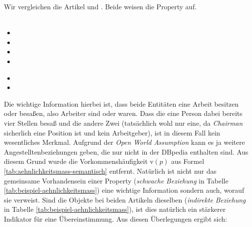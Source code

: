 \begin{bsp}
Wir vergleichen die Artikel  und .
Beide weisen die Property  auf.\\
~\\
 
\begin{itemize}
\item {}
\item {}
\item {}
\item {}
\end{itemize}
 
\begin{itemize}
\item {}
\item {}
\end{itemize}
\end{bsp}

Die wichtige Information hierbei ist, dass beide Entitäten eine Arbeit besitzen oder besaßen, also Arbeiter sind oder waren.
Dass die eine Person dabei bereits vier Stellen besaß und die andere Zwei (tatsächlich wohl nur eine, da \emph{Chairman} sicherlich eine Position ist und kein Arbeitgeber), ist in diesem Fall kein wesentliches Merkmal.
Aufgrund der \emph{Open World Assumption} kann es ja weitere Angestelltenbeziehungen geben, die nur nicht in der DBpedia enthalten sind.
Aus diesem Grund wurde die Vorkommenshäufigkeit v$(p)$ aus Formel \ref{tab:aehnlichkeitsmass-semantisch} entfernt.
Natürlich ist nicht nur das gemeinsame Vorhandensein einer Property (\emph{schwache Beziehung} in Tabelle \ref{tab:beispiel-aehnlichkeitsmass}) eine wichtige Information sondern auch, worauf sie verweist.
Sind die Objekte bei beiden Artikeln dieselben (\emph{indirekte Beziehung} in Tabelle \ref{tab:beispiel-aehnlichkeitsmass}), ist dies natürlich ein stärkerer Indikator für eine Übereinstimmung.
Aus diesen Überlegungen ergibt sich:


